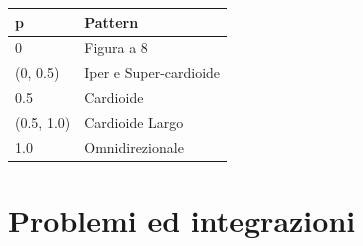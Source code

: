 \begin{tabular}{||p{3.0cm}|p{3.0cm}||} 
      \hline\hline
      p & Pattern \\
      \hline\hline
      0 & Figura a 8 \\
      \hline\hline
      (0, 0.5) & Iper e Super-cardioide\\
      \hline\hline
      0.5 & Cardioide \\
      \hline\hline
      (0.5, 1.0) & Cardioide Largo \\
      \hline\hline
      1.0 & Omnidirezionale \\
      \hline\hline
      \end{tabular}\centering

\section{Problemi ed integrazioni}
